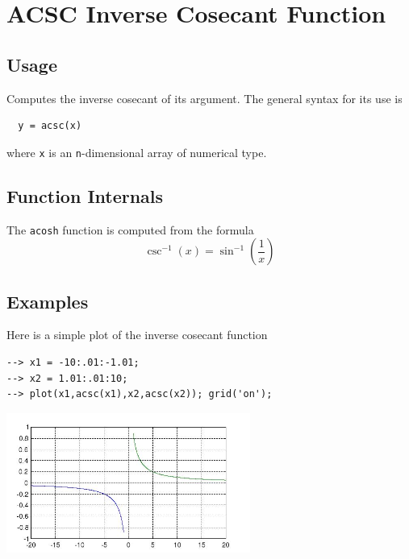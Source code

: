 \section{ACSC Inverse Cosecant Function}

\subsection{Usage}

Computes the inverse cosecant of its argument.  The general
syntax for its use is
\begin{verbatim}
  y = acsc(x)
\end{verbatim}
where \verb|x| is an \verb|n|-dimensional array of numerical type.
\subsection{Function Internals}

The \verb|acosh| function is computed from the formula
\[
   \csc^{-1}(x) = \sin^{-1}\left(\frac{1}{x}\right)
\]
\subsection{Examples}

Here is a simple plot of the inverse cosecant function
\begin{verbatim}
--> x1 = -10:.01:-1.01;
--> x2 = 1.01:.01:10;
--> plot(x1,acsc(x1),x2,acsc(x2)); grid('on');
\end{verbatim}


\centerline{\includegraphics[width=8cm]{acschplot}}

